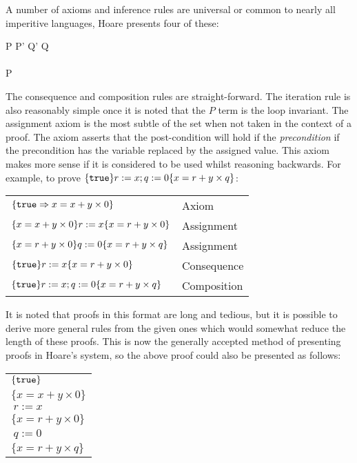 \documentclass[a4paper]{report}
\begin{document}
  A number of axioms and inference rules are universal or common to nearly all
  imperitive languages, Hoare presents four of these:
  \begin{display}{}
    {} \qquad

    { \quad P \impl P' \quad Q' \impl Q}
    {} \\
    \\
    {P \quad {}}
    {} \qquad

    { \quad {}}
    {}
  \end{display}

  The consequence and composition rules are straight-forward. The iteration rule
  is also reasonably simple once it is noted that the $P$ term is the loop
  invariant. The assignment axiom is the most subtle of the set when not taken
  in the context of a proof. The axiom asserts that the post-condition will hold
  if the \emph{precondition} if the precondition has the variable replaced by
  the assigned value. This axiom makes more sense if it is considered to be used
  whilst reasoning backwards. For example, to prove $\{\texttt{true}\}r := x; q :=
  0\{x = r + y \times q\}$:

  \begin{tabular}{ll}
    $\{\texttt{true} \Rightarrow x = x + y \times 0 \}$ & Axiom \\
    $\{x = x + y \times 0\}r:=x\{x = r + y \times 0\}$ & Assignment \\
    $\{x = r + y \times 0\}q:=0\{x = r + y \times q\}$ & Assignment \\
    $\{\texttt{true}\}r:=x\{x = r + y \times 0\}$ & Consequence \\
    $\{\texttt{true}\}r:=x; q:=0\{x = r + y \times q\}$ & Composition\\
  \end{tabular}

  It is noted that proofs in this format are long and tedious, but it is
  possible to derive more general rules from the given ones which would somewhat
  reduce the length of these proofs. This is now the generally accepted method
  of presenting proofs in Hoare's system, so the above proof could also be
  presented as follows:

  \begin{tabular}{l}
    $\{\texttt{true}\}$ \\
    $\{x = x + y \times 0\}$ \\
    $\ r:=x$ \\
    $\{x = r + y \times 0\}$ \\
    $\ q:=0$ \\
    $\{x = r + y \times q\}$
  \end{tabular}
\end{document}
